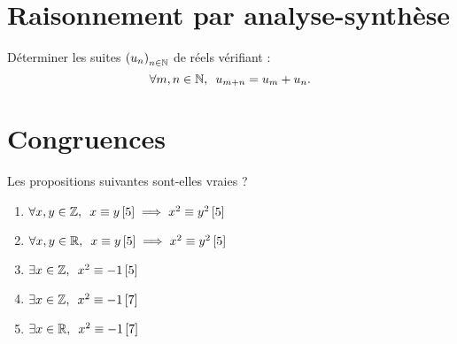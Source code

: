 \begin{corr}
\end{corr}

\section{Raisonnement par analyse-synthèse}

\begin{exo}
Déterminer les suites \(\left(u_n\right)_{n\in\mathbb{N}}\) de réels vérifiant : \[\quantifs{\forall m,n\in\N}u_{m+n}=u_m+u_n.\]
\end{exo}

\begin{corr}
\end{corr}

\section{Congruences}

\begin{exo}
Les propositions suivantes sont-elles vraies ?

\begin{enumerate}
\item \(\quantifs{\forall x,y\in\Z}x\equiv y\croch{5}\imp x^2\equiv y^2\croch{5}\) \\

\item \(\quantifs{\forall x,y\in\R}x\equiv y\croch{5}\imp x^2\equiv y^2\croch{5}\) \\

\item \(\quantifs{\exists x\in\Z}x^2\equiv-1\croch{5}\) \\

\item \(\quantifs{\exists x\in\Z}x^2\equiv-1\croch{7}\) \\

\item \(\quantifs{\exists x\in\R}x^2\equiv-1\croch{7}\)
\end{enumerate}
\end{exo}

\begin{corr}
\end{corr}

